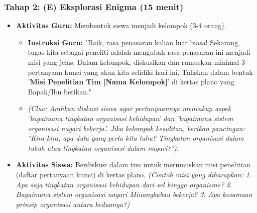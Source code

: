 \documentclass[a4paper,12pt]{article}
\begin{document}
\subsubsection{Tahap 2: (E) Eksplorasi Enigma (15 menit)}
\begin{itemize}
\item \textbf{Aktivitas Guru:} Membentuk siswa menjadi kelompok (3-4 orang).
    \begin{itemize}
    \item \textbf{Instruksi Guru:} "Baik, rasa penasaran kalian luar biasa! Sekarang, tugas kita sebagai peneliti adalah mengubah rasa penasaran ini menjadi misi yang jelas. Dalam kelompok, diskusikan dan rumuskan minimal 3 pertanyaan kunci yang akan kita selidiki hari ini. Tuliskan dalam bentuk '\textbf{Misi Penelitian Tim [Nama Kelompok]}' di kertas plano yang Bapak/Ibu berikan."
    \item \textit{(Clue: Arahkan diskusi siswa agar pertanyaannya mencakup aspek 'bagaimana tingkatan organisasi kehidupan' dan 'bagaimana sistem organisasi nagari bekerja'. Jika kelompok kesulitan, berikan pancingan: "Kira-kira, apa dulu yang perlu kita tahu? Tingkatan organisasi dalam tubuh atau tingkatan organisasi dalam nagari?").}
    \end{itemize}
\item \textbf{Aktivitas Siswa:} Berdiskusi dalam tim untuk merumuskan misi penelitian (daftar pertanyaan kunci) di kertas plano. \textit{(Contoh misi yang diharapkan: 1. Apa saja tingkatan organisasi kehidupan dari sel hingga organisme? 2. Bagaimana sistem organisasi nagari Minangkabau bekerja? 3. Apa kesamaan prinsip organisasi antara keduanya?)}
\end{itemize}
\end{document}
